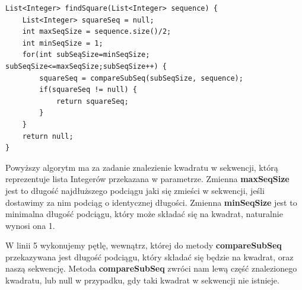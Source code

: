 \documentclass[document]{xmgr}
\begin{document}




\begin{lstlisting}[frame=single]
List<Integer> findSquare(List<Integer> sequence) {
	List<Integer> squareSeq = null;
	int maxSeqSize = sequence.size()/2;
	int minSeqSize = 1;
	for(int subSeąSize=minSeqSize; subSeqSize<=maxSeqSize;subSeqSize++) {
		squareSeq = compareSubSeq(subSeqSize, sequence);
		if(squareSeq != null) {
			return squareSeq;
		}
	}
	return null;
}
\end{lstlisting}

Powyższy algorytm ma za zadanie znalezienie kwadratu w sekwencji, którą reprezentuje lista Integerów przekazana w parametrze. Zmienna \textbf{maxSeqSize} jest to długość najdłuższego podciągu jaki się zmieści w sekwencji, jeśli dostawimy za nim podciąg o identycznej długości. Zmienna \textbf{minSeqSize} jest to minimalna długość podciągu, który może składać się na kwadrat, naturalnie wynosi ona 1. 

W linii 5 wykonujemy pętlę, wewnątrz, której do metody \textbf{compareSubSeq} przekazywana jest długość podciągu, który składać się będzie na kwadrat, oraz naszą sekwencję. Metoda \textbf{compareSubSeq} zwróci nam lewą część znalezionego kwadratu, lub null w przypadku, gdy taki kwadrat w sekwencji nie istnieje.
\end{document}
